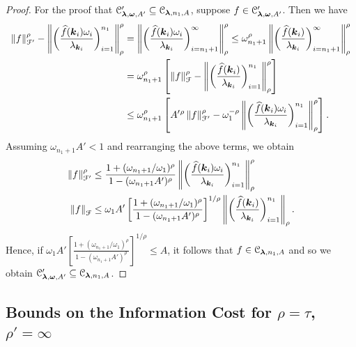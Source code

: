 \documentclass[USenglish]{article}
\theoremstyle{dgthm}
\theoremstyle{dgthm}
\theoremstyle{dgthm}
\theoremstyle{dgthm}
\theoremstyle{dgdef}
\theoremstyle{definition}
\newcommand{\hf}{\widehat{f}}
\newcommand{\norm}[2][{}]{\ensuremath{\left \lVert #2 \right \rVert}_{#1}}
\begin{document}
{\begin{proof}
For the proof that 
${\mathcal{C}}'_{\boldsymbol{\lambda}, \boldsymbol{\omega}, A'}
\subseteq 
{\mathcal{C}}_{\boldsymbol{\lambda}, n_1, A}$, 
suppose $f \in {\mathcal{C}}'_{\boldsymbol{\lambda},\boldsymbol{\omega},  A'}$. Then we have
\begin{align*}
    \norm[\calF']{f}^\rho- \norm[\rho]{\biggl ( \frac{\hf(\bsk_i) \omega_i }{\lambda_{\bsk_i}} \biggr) _{i=1}^{n_1}}^\rho 
	& = \norm[\rho]{\biggl ( \frac{\hf(\bsk_i) \omega_i }{\lambda_{\bsk_i}} \biggr) _{i=n_1 + 1}^{\infty}}^\rho 
     \le \omega_{n_1+1}^\rho \norm[\rho]{\biggl ( \frac{\hf(\bsk_i) }{\lambda_{\bsk_i}} \biggr) _{i=n_1 + 1}^{\infty}}^\rho \\
     & = \omega_{n_1+1}^\rho \left[ \norm[\calF]{f}^\rho - \norm[\rho]{\biggl ( \frac{\hf(\bsk_i) }{\lambda_{\bsk_i}} \biggr) _{i=1}^{n_1}}^\rho \right ]\\	
     & \le \omega_{n_1+1}^\rho \left[ A'{}^\rho \norm[\calF']{f}^\rho - \omega_1^{-\rho} \norm[\rho]{\biggl ( \frac{\hf(\bsk_i) \omega_i}{\lambda_{\bsk_i}} \biggr) _{i=1}^{n_1}}^\rho \right ].
\end{align*}
Assuming $\omega_{n_1+1}A' < 1$ and rearranging the above terms, we obtain
\begin{align*}
\norm[\calF']{f}^\rho & \le \frac{1 + (\omega_{n_1+1}/\omega_1)^\rho}{1 - (\omega_{n_1+1}A')^\rho} \norm[\rho]{\biggl ( \frac{\hf(\bsk_i) \omega_i }{\lambda_{\bsk_i}} \biggr) _{i=1}^{n_1}}^\rho \\
	\norm[\calF]{f} & \le \omega_1A'\left[\frac{1 + (\omega_{n_1+1}/\omega_1)^\rho}{1 - (\omega_{n_1+1}A')^\rho}\right]^{1/\rho} \norm[\rho]{\biggl ( \frac{\hf(\bsk_i)}{\lambda_{\bsk_i}} \biggr) _{i=1}^{n_1}}.
\end{align*}
Hence, if $\omega_1A'\left[\frac{1 + (\omega_{n_1+1}/\omega_1)^\rho}{1 - (\omega_{n_1+1}A')^\rho}\right]^{1/\rho} \le A$, it follows that $f \in {\mathcal{C}}_{\boldsymbol{\lambda}, n_1, A}$ and so
we obtain $
{\mathcal{C}}'_{\boldsymbol{\lambda}, \boldsymbol{\omega}, A'}
\subseteq
{\mathcal{C}}_{\boldsymbol{\lambda}, n_1, A}
$.
\end{proof}
}


\subsection{Bounds on the Information Cost for $\rho = \tau$, $\rho'=\infty$}\label{DHKM:revisexamp}
\end{document}
